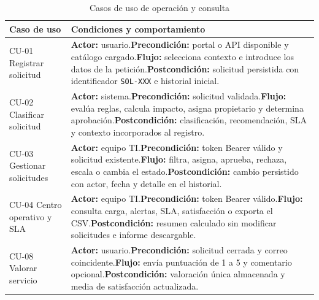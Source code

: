 \begin{table}[H]
\centering
\footnotesize
\renewcommand{\arraystretch}{1.16}
\begin{tabularx}{\textwidth}{p{3.3cm} X}
\textbf{Caso de uso} & \textbf{Condiciones y comportamiento} \\
\hline
CU-01 Registrar solicitud & \textbf{Actor:} usuario.\newline \textbf{Precondición:} portal o API disponible y catálogo cargado.\newline \textbf{Flujo:} selecciona contexto e introduce los datos de la petición.\newline \textbf{Postcondición:} solicitud persistida con identificador \texttt{SOL-XXX} e historial inicial. \\
CU-02 Clasificar solicitud & \textbf{Actor:} sistema.\newline \textbf{Precondición:} solicitud validada.\newline \textbf{Flujo:} evalúa reglas, calcula impacto, asigna propietario y determina aprobación.\newline \textbf{Postcondición:} clasificación, recomendación, SLA y contexto incorporados al registro. \\
CU-03 Gestionar solicitudes & \textbf{Actor:} equipo TI.\newline \textbf{Precondición:} token Bearer válido y solicitud existente.\newline \textbf{Flujo:} filtra, asigna, aprueba, rechaza, escala o cambia el estado.\newline \textbf{Postcondición:} cambio persistido con actor, fecha y detalle en el historial. \\
CU-04 Centro operativo y SLA & \textbf{Actor:} equipo TI.\newline \textbf{Precondición:} token Bearer válido.\newline \textbf{Flujo:} consulta carga, alertas, SLA, satisfacción o exporta el CSV.\newline \textbf{Postcondición:} resumen calculado sin modificar solicitudes e informe descargable. \\
CU-08 Valorar servicio & \textbf{Actor:} usuario.\newline \textbf{Precondición:} solicitud cerrada y correo coincidente.\newline \textbf{Flujo:} envía puntuación de 1 a 5 y comentario opcional.\newline \textbf{Postcondición:} valoración única almacenada y media de satisfacción actualizada. \\
\end{tabularx}
\caption{Casos de uso de operación y consulta}
\label{tabla:casos-uso-operacion}
\end{table}

